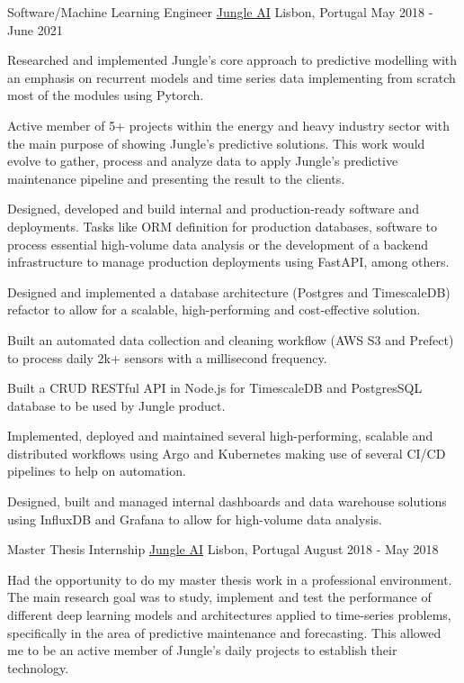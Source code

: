 \begin{cventries}
  \cventry
    {Software/Machine Learning Engineer} %
    {\href{https://www.jungle.ai}{Jungle AI}} %
    {Lisbon, Portugal} %
    {May 2018 - June 2021} %
    {
      \begin{cvitems} %
        \item {Researched and implemented Jungle’s core approach to predictive modelling with an emphasis on recurrent models and time series data implementing from scratch most of the modules using Pytorch.}
        \item {Active member of 5+ projects within the energy and heavy industry sector with the main purpose of showing Jungle’s predictive solutions. This work would evolve to gather, process and analyze data to apply Jungle's predictive maintenance pipeline and presenting the result to the clients.}
        \item {Designed, developed and build internal and production-ready software and deployments. Tasks like ORM definition for production databases, software to process essential high-volume data analysis or the development of a backend infrastructure to manage production deployments using FastAPI, among others.}
        \item {Designed and implemented a database architecture (Postgres and TimescaleDB) refactor to allow for a scalable, high-performing and cost-effective solution.}
        \item {Built an automated data collection and cleaning workflow (AWS S3 and Prefect) to process daily 2k+ sensors with a millisecond frequency.}
        \item {Built a CRUD RESTful API in Node.js for TimescaleDB and PostgresSQL database to be used by Jungle product.}
        \item {Implemented, deployed and maintained several high-performing, scalable and distributed workflows using Argo and Kubernetes making use of several CI/CD pipelines to help on automation.}
        \item {Designed, built and managed internal dashboards and data warehouse solutions using InfluxDB and Grafana to allow for high-volume data analysis.}
      \end{cvitems}
    }

  \cventry
    {Master Thesis Internship} %
    {\href{https://www.jungle.ai}{Jungle AI}} %
    {Lisbon, Portugal} %
    {August 2018 - May 2018} %
    {
      \begin{cvitems} %
        \item {Had the opportunity to do my master thesis work in a professional environment. The main research goal was to study, implement and test the performance of different deep learning models and architectures applied to time-series problems, specifically in the area of predictive maintenance and forecasting. This allowed me to be an active member of Jungle’s daily projects to establish their technology.}
      \end{cvitems}
    }


\end{cventries}
